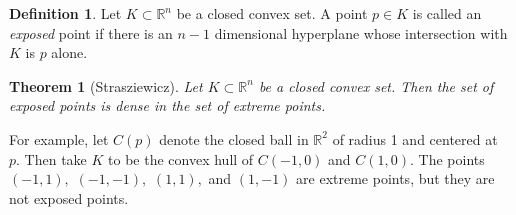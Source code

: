 \documentclass[12pt]{article}
\theoremstyle{theorem}
\newtheorem*{thm}{Theorem}
\theoremstyle{definition}
\newtheorem*{defn}{Definition}
\theoremstyle{remark}
\begin{document}
\begin{defn}
Let $K \subset {\mathbb{R}}^n$ be a closed convex set.  A point $p \in K$ is called an {\em exposed}
point if there is an $n-1$ dimensional hyperplane whose intersection with $K$ is $p$ alone.
\end{defn}

\begin{thm}[Strasziewicz]
Let $K \subset {\mathbb{R}}^n$ be a closed convex set.  Then the set of exposed points is dense in the set
of extreme points.
\end{thm}

For example, let $C(p)$ denote the closed ball in ${\mathbb{R}}^2$ of radius 1 and centered at $p.$  Then take
$K$ to be the convex hull of $C(-1,0)$ and $C(1,0)$.  The points $(-1,1),$ $(-1,-1),$ $(1,1),$ and $(1,-1)$ are
extreme points, but they are not exposed points.
\end{document}
